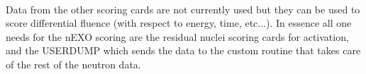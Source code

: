 \paragraph{}
Data from the other scoring cards are not currently used but they can be used to score differential fluence (with respect to energy, time, etc...). In essence all one needs for the nEXO scoring are the residual nuclei scoring cards for activation, and the USERDUMP which sends the data to the custom routine that takes care of the rest of the neutron data.